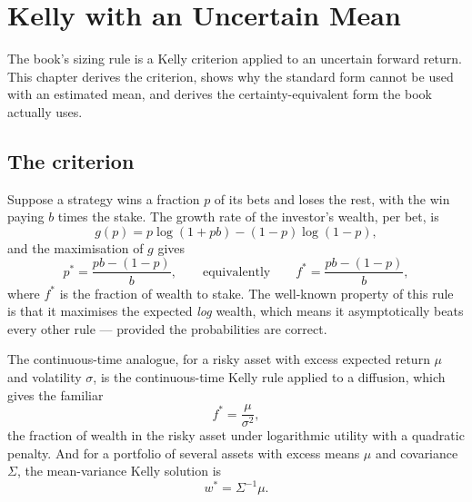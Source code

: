 
\chapter{Kelly with an Uncertain Mean}
\label{ch:kelly}

The book's sizing rule is a Kelly criterion applied to an uncertain
forward return. This chapter derives the criterion, shows why the standard
form cannot be used with an estimated mean, and derives the
certainty-equivalent form the book actually uses.

\section{The criterion}

Suppose a strategy wins a fraction \(p\) of its bets and loses the rest,
with the win paying \(b\) times the stake. The growth rate of the
investor's wealth, per bet, is
\begin{equation}
g(p) = p\log(1+pb) - (1-p)\log(1-p),
\end{equation}
and the maximisation of \(g\) gives
\begin{equation}
p^{*} = \frac{pb - (1-p)}{b},
\qquad\text{equivalently}\qquad
f^{*} = \frac{pb - (1-p)}{b},
\end{equation}
where \(f^{*}\) is the fraction of wealth to stake. The well-known
property of this rule is that it maximises the expected \emph{log}
wealth, which means it asymptotically beats every other rule --- provided
the probabilities are correct.

The continuous-time analogue, for a risky asset with excess expected return
\(\mu\) and volatility \(\sigma\), is the continuous-time Kelly rule
applied to a diffusion, which gives the familiar
\begin{equation}
f^{*} = \frac{\mu}{\sigma^{2}},
\end{equation}
the fraction of wealth in the risky asset under logarithmic utility with a
quadratic penalty. And for a portfolio of several assets with excess means
\(\mu\) and covariance \(\Sigma\), the mean-variance Kelly solution is
\begin{equation}
w^{*} = \Sigma^{-1}\mu.
\end{equation}

